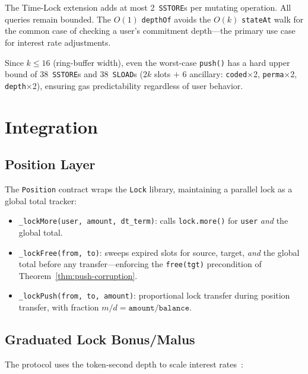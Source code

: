 \documentclass[10pt,a4paper,twocolumn]{article}
\theoremstyle{definition}
\theoremstyle{plain}
\theoremstyle{remark}
\begin{document}
The Time-Lock extension adds at most 2~\texttt{SSTORE}s per mutating operation. All queries remain bounded. The $O(1)$ \texttt{depthOf} avoids the $O(k)$ \texttt{stateAt} walk for the common case of checking a user's commitment depth---the primary use case for interest rate adjustments.

Since $k \leq 16$ (ring-buffer width), even the worst-case \texttt{push()} has a hard upper bound of 38~\texttt{SSTORE}s and 38~\texttt{SLOAD}s ($2k$ slots $+$ 6 ancillary: \texttt{coded}$\times$2, \texttt{perma}$\times$2, \texttt{depth}$\times$2), ensuring gas predictability regardless of user behavior.

\section{Integration}
\label{sec:integration}

\subsection{Position Layer}

The \texttt{Position} contract wraps the \texttt{Lock} library, maintaining a parallel lock as a global total tracker:

\begin{itemize}[nosep]
\item \texttt{\_lockMore(user, amount, dt\_term)}: calls \texttt{lock.more()} for \texttt{user} \emph{and} the global total.
\item \texttt{\_lockFree(from, to)}: sweeps expired slots for source, target, \emph{and} the global total before any transfer---enforcing the \texttt{free(tgt)} precondition of Theorem~\ref{thm:push-corruption}.
\item \texttt{\_lockPush(from, to, amount)}: proportional lock transfer during position transfer, with fraction $m/d = \texttt{amount}/\texttt{balance}$.
\end{itemize}

\subsection{Graduated Lock Bonus/Malus}

The protocol uses the token-second depth to scale interest rates~\cite{wp}:
\end{document}
